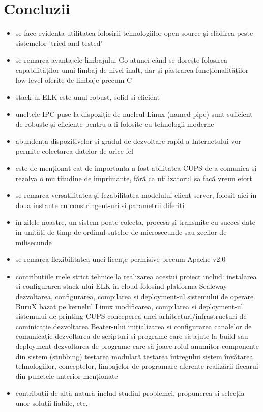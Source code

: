 \documentclass[a4paper, 12pt, twoside]{report}
\begin{document}
{\chapter{Concluzii}
\begin{itemize}
	\item se face evidenta utilitatea folosirii tehnologiilor open-source și clădirea peste sistemelor 'tried and tested'
	\item se remarca avantajele limbajului Go atunci când se dorește folosirea capabilităților unui limbaj de nivel înalt, dar și păstrarea funcționalităților low-level oferite de limbaje precum C
	\item stack-ul ELK este unul robust, solid si eficient
	\item uneltele IPC puse la dispoziție de nucleul Linux (named pipe) sunt suficient de robuste și eficiente pentru a fi folosite cu tehnologii moderne
	\item abundenta dispozitivelor și gradul de dezvoltare rapid a Internetului vor permite colectarea datelor de orice fel
	\item este de menționat cat de importanta a fost abilitatea CUPS de a comunica și rezolva o multitudine de imprimante, fără ca utilizatorul sa facă vreun efort
	\item se remarca versatilitatea și fezabilitatea modelului client-server, folosit aici în doua instante cu constringent-uri și parametrii diferiți
	\item în zilele noastre, un sistem poate colecta, procesa și transmite cu succes date în unități de timp de ordinul sutelor de microsecunde sau zecilor de milisecunde
	\item se remarca flexibilitatea unei licențe permisive precum Apache v2.0
	\item contribuțiile mele strict tehnice la realizarea acestui proiect includ:
		\subitem instalarea si configurarea stack-ului ELK in cloud folosind platforma Scaleway
		\subitem dezvoltarea, configurarea, compilarea si deployment-ul sistemului de operare BuruX bazat pe kernelul Linux
		\subitem modificarea, compilarea si deployment-ul sistemului de printing CUPS
		\subitem conceperea unei arhitecturi/infrastructuri de cominicație
		\subitem dezvoltarea Beater-ului
		\subitem inițializarea si configurarea canalelor de comunicație
		\subitem dezvoltarea de scripturi si programe care să ajute la build sau deployment
		\subitem dezvoltarea de programe care să joace rolul anumitor componente din sistem (stubbing)
		\subitem testarea modulară
		\subitem testarea întregului sistem
		\subitem învățarea tehnologiilor, conceptelor, limbajelor de programare aferente realizării fiecarui din punctele anterior menționate
	\item contribuții de altă natură includ studiul problemei, propunerea si selecția unor soluții fiabile, etc.
\end{itemize}

}
\end{document}
